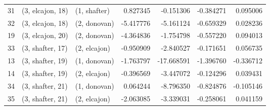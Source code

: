 \begin{tabular}{lllrrrr}
31 &  (3, elcajon, 18) &     (1, shafter) &   0.827345 &  -0.151306 &  -0.384271 &  0.095006 \\
32 &  (3, elcajon, 18) &     (2, donovan) &  -5.417776 &  -5.161124 &  -0.659329 &  0.028236 \\
19 &  (3, elcajon, 20) &     (2, donovan) &  -4.364836 &  -1.754798 &  -0.557220 &  0.094013 \\
33 &  (3, shafter, 17) &     (2, elcajon) &  -0.950909 &  -2.840527 &  -0.171651 &  0.056735 \\
13 &  (3, shafter, 19) &     (1, donovan) &  -1.763797 & -17.668591 &  -1.396760 & -0.336712 \\
14 &  (3, shafter, 19) &     (2, elcajon) &  -0.396569 &  -3.447072 &  -0.124296 &  0.039431 \\
34 &  (3, shafter, 21) &     (1, donovan) &   0.064244 &  -8.796350 &  -0.824876 & -0.105146 \\
35 &  (3, shafter, 21) &     (2, elcajon) &  -2.063085 &  -3.339031 &  -0.258061 &  0.041159 \\
\bottomrule
\end{tabular}
